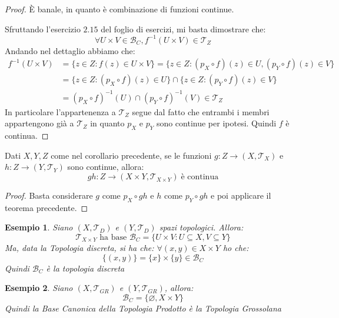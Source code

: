\documentclass[11pt,a4paper,twoside]{article}
\newtheorem{es}{Esempio}
\theoremstyle{definition}
\begin{document}
\begin{proof}
	\fbox{$\Rightarrow$} È banale, in quanto è combinazione di funzioni continue.

	\fbox{$\Leftarrow$} Sfruttando l'esercizio $2.15$ del foglio di esercizi, mi basta dimostrare che:
	\[\forall U \times V \in \mathcal B_C, f^{-1}(U \times V) \in \mathcal T_Z\]
	Andando nel dettaglio abbiamo che:
	\begin{align*}
		f^{-1}(U \times V) &= \{z \in Z: f(z) \in U \times V\} = \{z \in Z: (p_X \circ f)(z) \in U, (p_Y \circ f)(z)\in V\}\\
		&= \{z \in Z: (p_X \circ f)(z) \in U\} \cap\{z \in Z: (p_Y \circ f)(z) \in V\}\\
		&= (p_X \circ f)^{-1}(U) \cap (p_Y \circ f)^{-1}(V) \in \mathcal T_Z
	\end{align*}
	In particolare l'appartenenza a $\mathcal T_Z$ segue dal fatto che entrambi i membri appartengono già a $\mathcal T_Z$ in quanto $p_X$ e $p_Y$ sono continue per ipotesi.
	Quindi $f$ è continua.
\end{proof}

\begin{cor}{}{}
	Dati $X, Y, Z$ come nel corollario precedente, se le funzioni $g \colon Z \to (X, \mathcal T_X)$ e $h \colon Z \to (Y, \mathcal T_Y)$ sono continue, allora:
	\[ gh \colon Z \to (X \times Y, \mathcal T_{X \times Y}) \; \text{è continua}\]
\end{cor}

\begin{proof}
	Basta considerare $g$ come $p_X \circ gh$ e $h$ come $p_Y \circ gh$ e poi applicare il teorema precedente.
\end{proof}

\begin{es}
	Siano $(X, \mathcal T_D)$ e $(Y, \mathcal T_D)$ spazi topologici. Allora:
	\[\mathcal T_{X \times Y}\text{ ha base } \mathcal B_C = \{U \times V: U \subseteq X, V \subseteq Y\}\]
	Ma, data la Topologia discreta, si ha che: $\forall (x,y) \in X \times Y$ ho che:
	\[ \{(x,y)\} = \{x\} \times \{y\} \in \mathcal B_C\]
	Quindi $\mathcal B_C$ è la topologia discreta
\end{es}

\begin{es}
	Siano $(X, \mathcal T_{GR})$ e $(Y, \mathcal T_{GR})$, allora:
	\[\mathcal B_C = \{\varnothing, X\times Y\}\]
	Quindi la Base Canonica della Topologia Prodotto è la Topologia Grossolana
\end{es}
\end{document}
